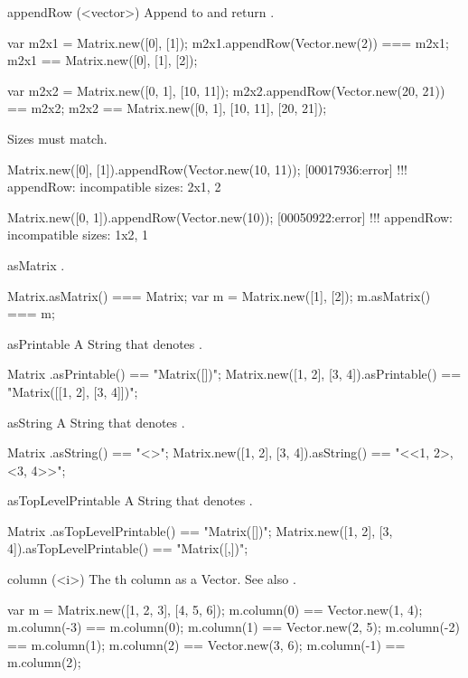 \begin{urbiscriptapi}
\item[appendRow](<vector>)%
  Append  to \this and return \this.
\begin{urbiassert}
var m2x1 = Matrix.new([0], [1]);
m2x1.appendRow(Vector.new(2)) === m2x1;
m2x1 == Matrix.new([0], [1], [2]);

var m2x2 = Matrix.new([0, 1], [10, 11]);
m2x2.appendRow(Vector.new(20, 21)) == m2x2;
m2x2 == Matrix.new([0, 1], [10, 11], [20, 21]);
\end{urbiassert}

  Sizes must match.
\begin{urbiscript}
Matrix.new([0], [1]).appendRow(Vector.new(10, 11));
[00017936:error] !!! appendRow: incompatible sizes: 2x1, 2

Matrix.new([0, 1]).appendRow(Vector.new(10));
[00050922:error] !!! appendRow: incompatible sizes: 1x2, 1
\end{urbiscript}


\item[asMatrix]%
  \this.
\begin{urbiassert}
Matrix.asMatrix() === Matrix;
var m = Matrix.new([1], [2]);
m.asMatrix() === m;
\end{urbiassert}


\item[asPrintable]%
  A String that denotes \this.
\begin{urbiassert}
Matrix                    .asPrintable() == "Matrix([])";
Matrix.new([1, 2], [3, 4]).asPrintable() == "Matrix([[1, 2], [3, 4]])";
\end{urbiassert}


\item[asString]%
  A String that denotes \this.
\begin{urbiassert}
Matrix                    .asString() == "<>";
Matrix.new([1, 2], [3, 4]).asString() == "<<1, 2>, <3, 4>>";
\end{urbiassert}


\item[asTopLevelPrintable]%
  A String that denotes \this.
\begin{urbiassert}
Matrix                    .asTopLevelPrintable()
  == "Matrix([])";
Matrix.new([1, 2], [3, 4]).asTopLevelPrintable()
 == "Matrix([\n  [1, 2],\n  [3, 4]])";
\end{urbiassert}


\item[column](<i>)%
  The th column as a Vector.  See also .
\begin{urbiassert}
var m = Matrix.new([1, 2, 3], [4, 5, 6]);
m.column(0) == Vector.new(1, 4);  m.column(-3) == m.column(0);
m.column(1) == Vector.new(2, 5);  m.column(-2) == m.column(1);
m.column(2) == Vector.new(3, 6);  m.column(-1) == m.column(2);


\end{urbiassert}
\end{urbiscriptapi}
